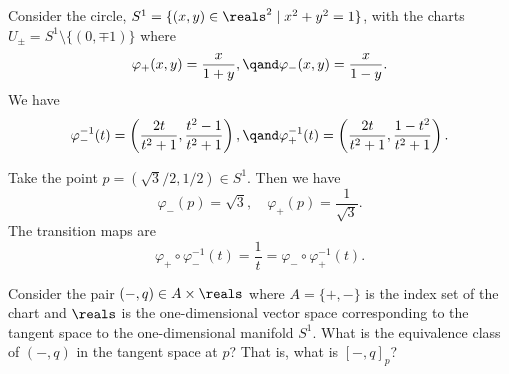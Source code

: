 \documentclass[fleqn]{NotesClass}
\begin{document}
    \begin{exm}{}{}
        Consider the circle, \(S^1 = \{(x, y) \in \reals^2 \mid x^2 + y^2 = 1\}\), with the charts \(U_{\pm} = S^1 \setminus \{(0, \mp 1)\}\) where
        \begin{equation}
            \varphi_+(x, y) = \frac{x}{1 + y}, \qand \varphi_-(x, y) = \frac{x}{1 - y}.
        \end{equation}
        We have
        \begin{equation}
            \varphi_-^{-1}(t) = \left( \frac{2t}{t^2 + 1}, \frac{t^2 - 1}{t^2 + 1} \right), \qand \varphi_+^{-1}(t) = \left( \frac{2t}{t^2 + 1}, \frac{1 - t^2}{t^2 + 1} \right).
        \end{equation}
        
        Take the point \(p = (\sqrt{3}/2, 1/2) \in S^1\).
        Then we have
        \begin{equation}
            \varphi_-(p) = \sqrt{3}, \quad \varphi_+(p) = \frac{1}{\sqrt{3}}.
        \end{equation}
        The transition maps are
        \begin{equation}
            \varphi_+ \circ \varphi_-^{-1}(t) = \frac{1}{t} = \varphi_- \circ \varphi_+^{-1}(t).
        \end{equation}
        
        Consider the pair \((-, q) \in A \times \reals\) where \(A = \{{+}, {-}\}\) is the index set of the chart and \(\reals\) is the one-dimensional vector space corresponding to the tangent space to the one-dimensional manifold \(S^1\).
        What is the equivalence class of \((-, q)\) in the tangent space at \(p\)?
        That is, what is \([-, q]_p\)?
        

\end{exm}
\end{document}
